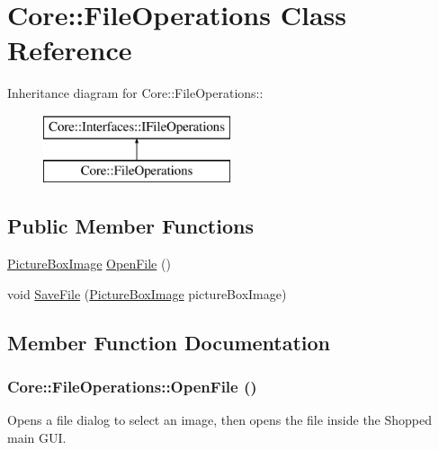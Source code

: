 \hypertarget{class_core_1_1_file_operations}{
\section{Core::FileOperations Class Reference}
\label{class_core_1_1_file_operations}
}
Inheritance diagram for Core::FileOperations::\begin{figure}[H]
\begin{center}
\leavevmode
\includegraphics[height=2cm]{class_core_1_1_file_operations}
\end{center}
\end{figure}
\subsection*{Public Member Functions}
\begin{DoxyCompactItemize}
\item 
\hyperlink{class_core_1_1_images_1_1_picture_box_image}{PictureBoxImage} \hyperlink{class_core_1_1_file_operations_a69d32ba0dedcd243aecf7bb8a29ce8d2}{OpenFile} ()
\item 
void \hyperlink{class_core_1_1_file_operations_a0fc5427e96d79e70c6409ec22e70abba}{SaveFile} (\hyperlink{class_core_1_1_images_1_1_picture_box_image}{PictureBoxImage} pictureBoxImage)
\end{DoxyCompactItemize}


\subsection{Member Function Documentation}
\hypertarget{class_core_1_1_file_operations_a69d32ba0dedcd243aecf7bb8a29ce8d2}{
\subsubsection[{OpenFile}]{ Core::FileOperations::OpenFile ()}}
\label{class_core_1_1_file_operations_a69d32ba0dedcd243aecf7bb8a29ce8d2}
Opens a file dialog to select an image, then opens the file inside the Shopped main GUI.


